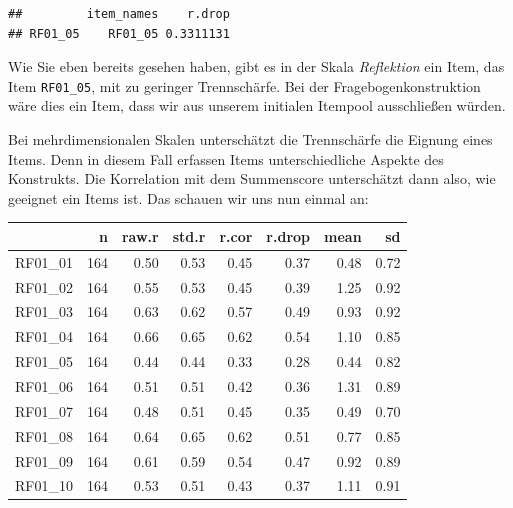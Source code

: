 \documentclass[
  ngerman,
]{book}
\newenvironment{Shaded}{\begin{snugshade}}{\end{snugshade}}
\newcommand{\AttributeTok}[1]{\textcolor[rgb]{0.13,0.29,0.53}{#1}}
\newcommand{\CommentTok}[1]{\textcolor[rgb]{0.56,0.35,0.01}{\textit{#1}}}
\newcommand{\DecValTok}[1]{\textcolor[rgb]{0.00,0.00,0.81}{#1}}
\newcommand{\FunctionTok}[1]{\textcolor[rgb]{0.13,0.29,0.53}{\textbf{#1}}}
\newcommand{\NormalTok}[1]{#1}
\newcommand{\OtherTok}[1]{\textcolor[rgb]{0.56,0.35,0.01}{#1}}
\newcommand{\SpecialCharTok}[1]{\textcolor[rgb]{0.81,0.36,0.00}{\textbf{#1}}}
\begin{document}
\begin{verbatim}
##         item_names    r.drop
## RF01_05    RF01_05 0.3311131
\end{verbatim}

Wie Sie eben bereits gesehen haben, gibt es in der Skala \emph{Reflektion} ein Item, das Item \texttt{RF01\_05}, mit zu geringer Trennschärfe. Bei der Fragebogenkonstruktion wäre dies ein Item, dass wir aus unserem initialen Itempool ausschließen würden.

Bei mehrdimensionalen Skalen unterschätzt die Trennschärfe die Eignung eines Items. Denn in diesem Fall erfassen Items unterschiedliche Aspekte des Konstrukts. Die Korrelation mit dem Summenscore unterschätzt dann also, wie geeignet ein Items ist. Das schauen wir uns nun einmal an:

\begin{Shaded}
\end{Shaded}

\begin{tabular}{l|r|r|r|r|r|r|r}
\hline
  & n & raw.r & std.r & r.cor & r.drop & mean & sd\\
\hline
RF01\_01 & 164 & 0.50 & 0.53 & 0.45 & 0.37 & 0.48 & 0.72\\
\hline
RF01\_02 & 164 & 0.55 & 0.53 & 0.45 & 0.39 & 1.25 & 0.92\\
\hline
RF01\_03 & 164 & 0.63 & 0.62 & 0.57 & 0.49 & 0.93 & 0.92\\
\hline
RF01\_04 & 164 & 0.66 & 0.65 & 0.62 & 0.54 & 1.10 & 0.85\\
\hline
RF01\_05 & 164 & 0.44 & 0.44 & 0.33 & 0.28 & 0.44 & 0.82\\
\hline
RF01\_06 & 164 & 0.51 & 0.51 & 0.42 & 0.36 & 1.31 & 0.89\\
\hline
RF01\_07 & 164 & 0.48 & 0.51 & 0.45 & 0.35 & 0.49 & 0.70\\
\hline
RF01\_08 & 164 & 0.64 & 0.65 & 0.62 & 0.51 & 0.77 & 0.85\\
\hline
RF01\_09 & 164 & 0.61 & 0.59 & 0.54 & 0.47 & 0.92 & 0.89\\
\hline
RF01\_10 & 164 & 0.53 & 0.51 & 0.43 & 0.37 & 1.11 & 0.91\\
\hline
\end{tabular}
\end{document}
